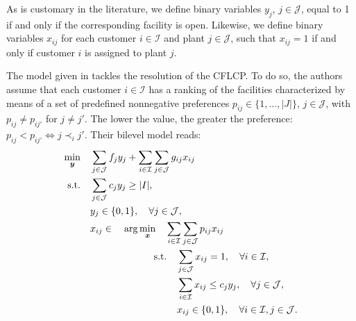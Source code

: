 \documentclass[preprint,11pt,authoryear]{elsarticle}
\def\J{\mathcal{J}}
\def\I{\mathcal{I}}
\begin{document}
As is customary in the literature, we define binary variables $y_j$, $j\in \J$, equal to 1 if and only if the corresponding facility is open. Likewise, we define binary variables $x_{ij}$ for each customer $i\in \I$ and plant $j\in \J$, such that $x_{ij}=1$ if and only if customer $i$ is assigned to plant $j$. 

The model given in \citet{calvete2020} tackles the resolution of the CFLCP. To do so, the authors assume that each customer $i\in \I$ has a ranking of the facilities characterized by means of a set of predefined nonnegative preferences $p_{ij}\in \{1,\dots,|J|\}$, $j \in \J$, with $p_{ij} \neq p_{ij'}$ for $j\neq j'$. The lower the value, the greater the preference: $p_{ij} < p_{ij'} \Leftrightarrow j\prec_i j'$. Their bilevel model reads:
\begin{subequations} \label{BMCalvete}
\begin{align} 
\min_{\boldsymbol{y}} \quad & \sum_{j\in \J} f_jy_j + \sum_{i\in \I} \sum_{j\in \J} g_{ij}x_{ij}  \label{BMCalvete_OF1} \\
\text{s.t.} \quad &\sum_{j\in \J} c_jy_j \geq |I|, \label{BMCalvete_FeasibilityCut}\\
& y_j \in \{0,1\}, \quad \forall j\in\J, \label{BMCalvete_Ybinarias} \\
& x_{ij} \in \quad\arg\min_{\boldsymbol{x}}\quad  \sum_{i\in \I} \sum_{j\in \J} p_{ij}x_{ij}  \label{BMCalvete_OF2}  \\
    &\hspace{23mm}  \text{s.t.}\quad   \sum_{j\in \J} x_{ij} = 1, \quad \forall i\in \I, \label{BMCalvete_allocation} \\
&\hspace{23mm} \phantom{s.t.} \quad \sum_{i\in \I} x_{ij}  \le c_jy_j, \quad \forall j\in\J, \label{BMCalvete_capacity}\\
&\hspace{23mm}\phantom{s.t.} \quad x_{ij} \in \{0,1\}, \quad \forall i \in \I, j \in \J.  \label{BMCalvete_Xbinarias}
\end{align}
\end{subequations}
\end{document}
